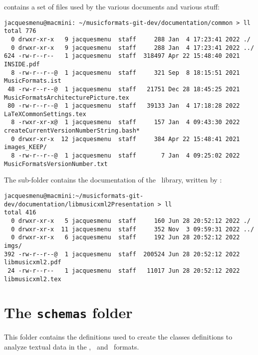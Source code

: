  contains a set of files used by the various documents and various stuff:
\begin{lstlisting}[language=Terminal]
jacquesmenu@macmini: ~/musicformats-git-dev/documentation/common > ll
total 776
  0 drwxr-xr-x   9 jacquesmenu  staff     288 Jan  4 17:23:41 2022 ./
  0 drwxr-xr-x   9 jacquesmenu  staff     288 Jan  4 17:23:41 2022 ../
624 -rw-r--r--   1 jacquesmenu  staff  318497 Apr 22 15:48:40 2021 INSIDE.pdf
  8 -rw-r--r--@  1 jacquesmenu  staff     321 Sep  8 18:15:51 2021 MusicFormats.ist
 48 -rw-r--r--@  1 jacquesmenu  staff   21751 Dec 28 18:45:25 2021 MusicFormatsArchitecturePicture.tex
 80 -rw-r--r--@  1 jacquesmenu  staff   39133 Jan  4 17:18:28 2022 LaTeXCommonSettings.tex
  8 -rwxr-xr-x@  1 jacquesmenu  staff     157 Jan  4 09:43:30 2022 createCurrentVersionNumberString.bash*
  0 drwxr-xr-x  12 jacquesmenu  staff     384 Apr 22 15:48:41 2021 images_KEEP/
  8 -rw-r--r--@  1 jacquesmenu  staff       7 Jan  4 09:25:02 2022 MusicFormatsVersionNumber.txt
\end{lstlisting}

The  sub-folder contains the documentation of the \libmusicxml\ library, written by \fober:
\begin{lstlisting}[language=Terminal]
jacquesmenu@macmini:~/musicformats-git-dev/documentation/libmusicxml2Presentation > ll
total 416
  0 drwxr-xr-x   5 jacquesmenu  staff     160 Jun 28 20:52:12 2022 ./
  0 drwxr-xr-x  11 jacquesmenu  staff     352 Nov  3 09:59:31 2022 ../
  0 drwxr-xr-x   6 jacquesmenu  staff     192 Jun 28 20:52:12 2022 imgs/
392 -rw-r--r--@  1 jacquesmenu  staff  200524 Jun 28 20:52:12 2022 libmusicxml2.pdf
 24 -rw-r--r--   1 jacquesmenu  staff   11017 Jun 28 20:52:12 2022 libmusicxml2.tex
\end{lstlisting}


\section{The {\tt schemas} folder}

This folder contains the definitions used to create the classes definitions to analyze textual data in the \mxml, \mei\ and \bmml\ formats.

